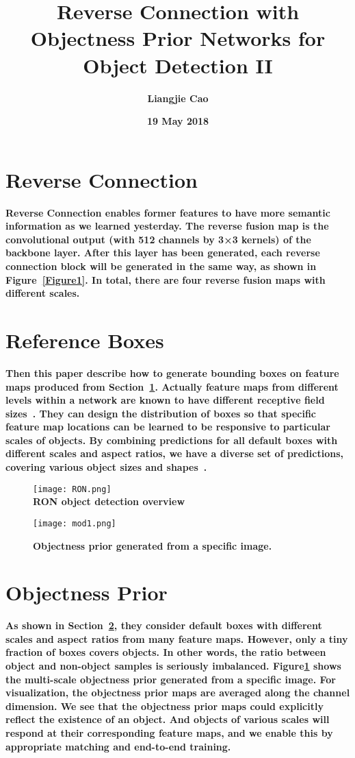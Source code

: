 \documentclass[40pt]{article}
\begin{document}
\title{\textbf{Reverse Connection with Objectness Prior Networks for Object Detection II}}
\author{\textbf{Liangjie Cao}}
\date{\textbf{19 May 2018}}
\maketitle
\par
\setlength{\baselineskip}{20pt}
\section{Reverse Connection}\label{Section 1}
\textbf{Reverse Connection enables former features to have more semantic information as we learned yesterday.  The reverse fusion map is the convolutional output (with 512 channels by 3×3 kernels) of the backbone layer. After this layer has been generated, each reverse connection block will be generated in the same way, as shown in Figure~\ref{Figure1}. In total, there are four reverse fusion maps with different scales. }
\par
\section{Reference Boxes}\label{Section 2}
\textbf{Then this paper describe how to generate bounding boxes on feature maps produced from Section~\ref{Section 1}. Actually feature maps from different levels within a network are known to have different receptive ﬁeld sizes~\cite{name1}. They can design the distribution of boxes so that speciﬁc feature map locations can be learned to be responsive to particular scales of objects. By combining predictions for all default boxes with different scales and aspect ratios, we have a diverse set of predictions, covering various object sizes and shapes~\cite{name2}.
}
   \begin{figure}[htbp]
 \centering
 \texttt{[image: RON.png]}\\
 \caption{\textbf{RON object detection overview}}\label{Figure1}
  \centering
 \texttt{[image: mod1.png]}\\
 \caption{\textbf{ Objectness prior generated from a speciﬁc image.}}\label{Figure2}
\end{figure}
\par
\section{Objectness Prior}
\textbf{As shown in Section~\ref{Section 2}, they consider default boxes with different scales and aspect ratios from many feature maps. However, only a tiny fraction of boxes covers objects. In other words, the ratio between object and non-object samples is seriously imbalanced. Figure\ref{Figure2} shows the multi-scale objectness prior generated from a speciﬁc image. For visualization, the objectness prior maps are averaged along the channel dimension. We see that the objectness prior maps could explicitly reﬂect the existence of an object. And objects of various scales will respond at their corresponding feature maps, and we enable this by appropriate matching and end-to-end training.
}\\


\end{document}
